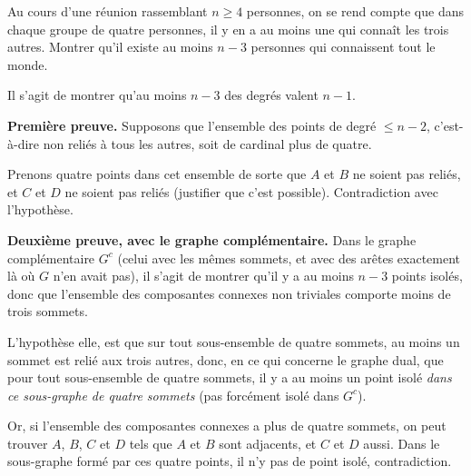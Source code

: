 \begin{exo}[Nombre de connaissances]
Au cours d'une réunion rassemblant $n\geq 4$ personnes, on se rend compte que dans chaque groupe de quatre personnes, il y en a au moins une qui connaît les trois autres. Montrer qu'il existe au moins $n-3$ personnes qui connaissent tout le monde.
\begin{sol}
Il s'agit de montrer qu'au moins $n-3$ des degrés valent $n-1$.

\textbf{Première preuve.} Supposons que l'ensemble des points de degré $\leq n-2$, c'est-à-dire non reliés à tous les autres, soit de cardinal plus de quatre.

Prenons quatre points dans cet ensemble de sorte que $A$ et $B$ ne soient pas reliés, et $C$ et $D$ ne soient pas reliés (justifier que c'est possible). Contradiction avec l'hypothèse.

\textbf{Deuxième preuve, avec le graphe complémentaire. } Dans le graphe complémentaire $G^c$ (celui avec les mêmes sommets, et avec des arêtes exactement là où $G$ n'en avait pas), il s'agit de montrer qu'il y a au moins $n-3$ points isolés, donc que l'ensemble des composantes connexes non triviales comporte moins de trois sommets.

L'hypothèse elle, est que sur tout sous-ensemble de quatre sommets, au moins un sommet est relié aux trois autres, donc, en ce qui concerne le graphe dual, que pour tout sous-ensemble de quatre sommets, il y a au moins un point isolé \emph{dans ce sous-graphe de quatre sommets} (pas forcément isolé dans $G^c$).

Or, si l'ensemble des composantes connexes a plus de quatre sommets, on peut trouver $A$, $B$, $C$ et $D$ tels que $A$ et $B$ sont adjacents, et $C$ et $D$ aussi. Dans le sous-graphe formé par ces quatre points, il n'y pas de point isolé, contradiction.

\end{sol}
\end{exo}

